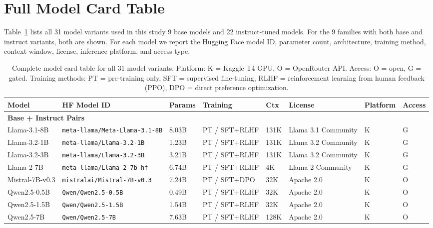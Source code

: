 \section{Full Model Card Table}
\label{app:model_details}

Table~\ref{tab:all_models} lists all 31 model variants used in this study  9 base models and 22 instruct-tuned models. For the 9 families with both base and instruct variants, both are shown. For each model we report the Hugging Face model ID, parameter count, architecture, training method, context window, license, inference platform, and access type.

\begin{table}[h]
\centering\small
\caption{Complete model card table for all 31 model variants. Platform: K = Kaggle T4 GPU, O = OpenRouter API. Access: O = open, G = gated. Training methods: PT = pre-training only, SFT = supervised fine-tuning, RLHF = reinforcement learning from human feedback (PPO), DPO = direct preference optimization.}
\label{tab:all_models}
\begin{tabular}{llllllll}
\toprule
\textbf{Model} & \textbf{HF Model ID} & \textbf{Params} & \textbf{Training} & \textbf{Ctx} & \textbf{License} & \textbf{Platform} & \textbf{Access} \\
\midrule
\multicolumn{8}{l}{\textbf{Base + Instruct Pairs}} \\
\midrule
Llama-3.1-8B & \texttt{meta-llama/Meta-Llama-3.1-8B} & 8.03B & PT / SFT+RLHF & 131K & Llama 3.1 Community & K & G \\
Llama-3.2-1B & \texttt{meta-llama/Llama-3.2-1B} & 1.23B & PT / SFT+RLHF & 131K & Llama 3.2 Community & K & G \\
Llama-3.2-3B & \texttt{meta-llama/Llama-3.2-3B} & 3.21B & PT / SFT+RLHF & 131K & Llama 3.2 Community & K & G \\
Llama-2-7B & \texttt{meta-llama/Llama-2-7b-hf} & 6.74B & PT / SFT+RLHF & 4K & Llama 2 Community & K & G \\
Mistral-7B-v0.3 & \texttt{mistralai/Mistral-7B-v0.3} & 7.24B & PT / SFT+DPO & 32K & Apache 2.0 & K & O \\
Qwen2.5-0.5B & \texttt{Qwen/Qwen2.5-0.5B} & 0.49B & PT / SFT+RLHF & 32K & Apache 2.0 & K & O \\
Qwen2.5-1.5B & \texttt{Qwen/Qwen2.5-1.5B} & 1.54B & PT / SFT+RLHF & 32K & Apache 2.0 & K & O \\
Qwen2.5-7B & \texttt{Qwen/Qwen2.5-7B} & 7.63B & PT / SFT+RLHF & 128K & Apache 2.0 & K & O \\

\end{tabular}
\end{table}

